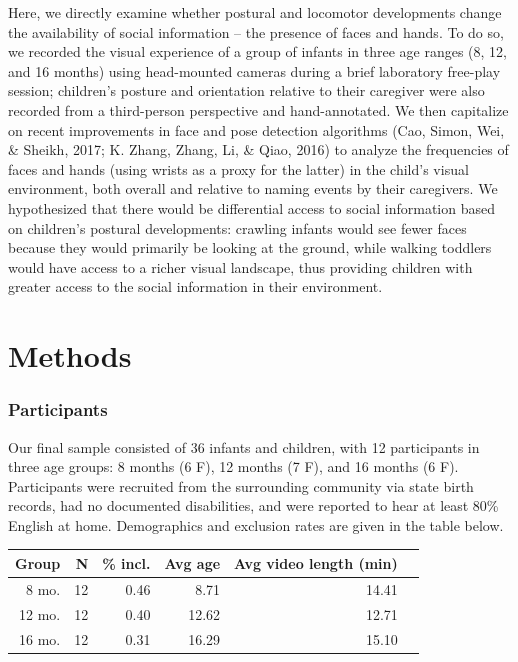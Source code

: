 \documentclass[10pt, letterpaper]{article}
\begin{document}
Here, we directly examine whether postural and locomotor developments
change the availability of social information -- the presence of faces
and hands. To do so, we recorded the visual experience of a group of
infants in three age ranges (8, 12, and 16 months) using head-mounted
cameras during a brief laboratory free-play session; children's posture
and orientation relative to their caregiver were also recorded from a
third-person perspective and hand-annotated. We then capitalize on
recent improvements in face and pose detection algorithms (Cao, Simon,
Wei, \& Sheikh, 2017; K. Zhang, Zhang, Li, \& Qiao, 2016) to analyze the
frequencies of faces and hands (using wrists as a proxy for the latter)
in the child's visual environment, both overall and relative to naming
events by their caregivers. We hypothesized that there would be
differential access to social information based on children's postural
developments: crawling infants would see fewer faces because they would
primarily be looking at the ground, while walking toddlers would have
access to a richer visual landscape, thus providing children with
greater access to the social information in their environment.

\section{Methods}\label{methods}

\subsubsection{Participants}\label{participants}

Our final sample consisted of 36 infants and children, with 12
participants in three age groups: 8 months (6 F), 12 months (7 F), and
16 months (6 F). Participants were recruited from the surrounding
community via state birth records, had no documented disabilities, and
were reported to hear at least 80\% English at home. Demographics and
exclusion rates are given in the table below.

\begin{table}[ht]
\centering
\begin{tabular}{rrrrrr}
\hline
Group & N & \% incl. & Avg age & Avg video length (min) \\ 
\hline
8 mo. &   12 & 0.46 & 8.71 & 14.41 \\ 
12 mo. &  12 & 0.40 & 12.62 & 12.71 \\ 
16 mo. &  12 & 0.31 & 16.29 & 15.10\\ 
\hline
\end{tabular}
\end{table}
\end{document}
